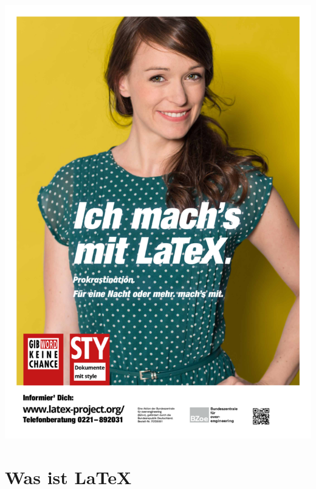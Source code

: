 \documentclass{beamer}
\begin{document}
	\begin{frame}
		\begin{minipage}[0.5\textheight]{0.5\textwidth}
			\tableofcontents[hideallsubsections]
		\end{minipage}
		\begin{minipage}{0.45\textwidth}
			\includegraphics[width=1.05\textwidth]{./images/gib-word-keine-chance}
		\end{minipage}
	\end{frame}
		
		
	\section{Was ist \LaTeX{}}
\end{document}
